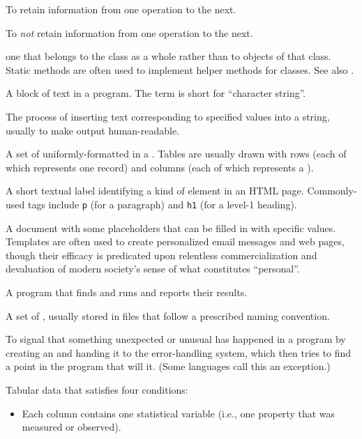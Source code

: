 \begin{description}
To retain information from one operation to the next.

To \emph{not} retain information from one operation to the next.

one that belongs to the class as a whole rather than to objects of that class.
Static methods are often used to implement helper methods for classes.
See also .

A block of text in a program. The term is short for ``character string''.

The process of inserting text corresponding to specified values into a string,
usually to make output human-readable.

A set of uniformly-formatted  in a . Tables are usually drawn with rows (each
of which represents one record) and columns (each of which represents a
).

A short textual label identifying a kind of element in an HTML page.
Commonly-used tags include \texttt{p} (for a paragraph) and \texttt{h1} (for a level-1
heading).

A document with some placeholders that can be filled in with specific values.
Templates are often used to create personalized email messages and web pages,
though their efficacy is predicated upon relentless commercialization and
devaluation of modern society's sense of what constitutes ``personal''.

A program that finds and runs  and reports their
results.

A set of , usually stored in files that follow a
prescribed naming convention.

To signal that something unexpected or unusual has happened in a program by
creating an  and handing it to the error-handling
system, which then tries to find a point in the program that will
 it. (Some languages call this \emph{} an
exception.)

Tabular data that satisfies four conditions:
\begin{itemize}
\item
  Each column contains one statistical variable
  (i.e., one property that was measured or observed).


\end{itemize}
\end{description}
